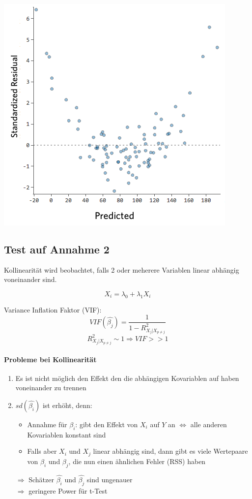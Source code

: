 \documentclass[10pt]{report}
\theoremstyle{definition}
\begin{document}
\includegraphics[scale=0.5]{VorlesungenTexDateien/images/Nonlinear-residual-11}

\subsection{Test auf Annahme 2}
Kollinearität wird beobachtet, falls 2 oder meherere Variablen linear abhängig voneinander sind.

\[ X_i = \lambda_0 + \lambda_1 X_i \]

Variance Inflation Faktor (VIF):
\[ VIF(\hat{\beta_j})= \frac{1}{1- R_{X_j|X_{p \neq j}}^{2}} \]
\[ R_{X_j|X_{p \neq j}}^{2} \sim 1 \Rightarrow VIF >> 1 \]

\paragraph{Probleme bei Kollinearität}
\begin{enumerate}
	\item Es ist nicht möglich den Effekt den die abhängigen Kovariablen auf  haben voneinander zu trennen
	\item $sd(\hat{\beta_i})$ ist erhöht, denn: 
		\begin{itemize}
			\item Annahme für $\beta_i$: gibt den Effekt von $X_i$ auf $Y$ an $\Leftrightarrow$ alle anderen Kovariablen konstant sind
			\item Falls aber $X_i$ und $X_j$ linear abhängig sind, dann gibt es viele Wertepaare von $\beta_i$ und $\beta_j$, die nun einen ähnlichen Fehler (RSS) haben
		\end{itemize}
		$\Rightarrow$ Schätzer $\hat{\beta_i}$ und $\hat{\beta_j}$ sind ungenauer \\
		$\Rightarrow$ geringere Power für t-Test
\end{enumerate}
\end{document}
